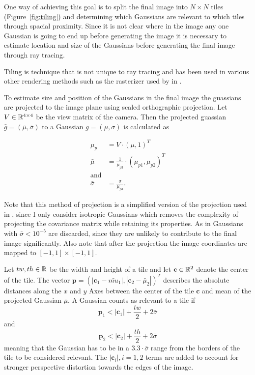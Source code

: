 \documentclass[a4paper, 11pt]{memoir}
\begin{document}
    One way of achieving this goal is to split the final image into $N \times N$ tiles (\eg Figure~\ref{fig:tiling}) and determining which Gaussians
    are relevant to which tiles through spacial proximity. Since it is not clear where in the image any one Gaussian is
    going to end up before generating the image it is necessary to estimate location and size of the Gaussians before
    generating the final image through ray tracing.

    Tiling is technique that is not unique to ray tracing and has been used in various other rendering methods such as the rasterizer
    used by \citeauthor{kerbl3Dgaussians} in \cite{kerbl3Dgaussians}.

    To estimate size and position of the Gaussians in the final image the guassians are projected to the image plane using
    scaled orthographic projection. Let $V \in \mathbb{R}^{4 \times 4}$ be the view matrix of the camera. Then the projected guassian
    $\bar{g} = (\bar{\mu}, \bar{\sigma})$ to a Gaussian $g = (\mu, \sigma)$ is calculated as

    \begin{align}
        \mu_p &= V \cdot (\mu, 1)^T\\
        \bar{\mu} &= \frac{1}{\mu_{p3}} \cdot (\mu_{p1}, \mu_{p2})^T\\
        \text{and}\nonumber\\
        \bar{\sigma} &= \frac{\sigma}{\mu_{p3}}.
    \end{align}

    Note that this method of projection is a simplified version of the projection used in \cite{kerbl3Dgaussians}, since I only consider isotropic Gaussians which removes
    the complexity of projecting the covariance matrix while retaining its properties.
    As in \cite{Rhodin:2015} Gaussians with $\bar{\sigma} < 10^{-5}$ are discarded, since they are unlikely to contribute to the final image significantly.
    Also note that after the projection the image coordinates are mapped to $[-1, 1] \times [-1, 1]$.

    Let $tw, th \in \mathbb{R}$ be the width and height of a tile and let $\mathbf{c} \in \mathbb{R}^2$ denote the center of the tile. The vector $\mathbf{p} = (|\mathbf{c}_1 - \bar{mu}_1|, |\mathbf{c}_2 - \bar{\mu}_2|)^T$
    describes the absolute distances along the $x$ and $y$ Axes between the center of the tile $\mathbf{c}$ and mean of the projected Gaussian $\bar{\mu}$.
    A Gaussian counts as relevant to a tile if
    \begin{equation}
        \mathbf{p}_1 < |\mathbf{c}_1| + \frac{tw}{2} + 2\bar{\sigma}
    \end{equation}
    and 
    \begin{equation}
        \mathbf{p}_2 < |\mathbf{c}_2| + \frac{th}{2} + 2\bar{\sigma}
    \end{equation}
    meaning that the Gaussian has to be in a $3.3 \cdot \bar{\sigma}$ range from the borders of the tile to be considered relevant.
    The $|\mathbf{c}_i|, i=1,2$ terms are added to account for stronger perspective distortion towards the edges of the image.
\end{document}
